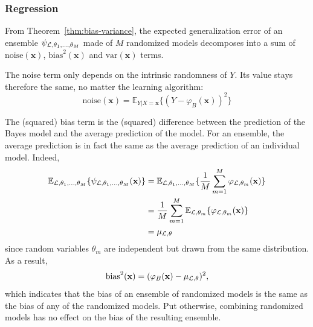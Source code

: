 \subsubsection{Regression}

From Theorem~\ref{thm:bias-variance}, the expected generalization error of an
ensemble $\psi_{{\cal L},\theta_1,\dots,\theta_M}$ made of $M$ randomized
models decomposes into a sum of $\text{noise}(\mathbf{x})$,
$\text{bias}^2(\mathbf{x})$ and $\text{var}(\mathbf{x})$ terms.

The noise term only depends on the intrinsic randomness of $Y$. Its value
stays therefore the same, no matter the learning algorithm:
\begin{equation}
\text{noise}(\mathbf{x}) = \mathbb{E}_{Y|X=\mathbf{x}} \{ (Y - \varphi_B(\mathbf{x}))^2 \}
\end{equation}

The (squared) bias term is the (squared) difference between the prediction of the Bayes model
and the average prediction of the model. For an ensemble, the average prediction
is in fact the same as the average prediction of an individual model. Indeed,
\begin{align}
\mathbb{E}_{{\cal L},\theta_1,\dots,\theta_M} \{ \psi_{{\cal L},\theta_1,\dots,\theta_M}(\mathbf{x}) \} &= \mathbb{E}_{{\cal L},\theta_1,\dots,\theta_M} \{ \frac{1}{M} \sum_{m=1}^M \varphi_{{\cal L},\theta_m}(\mathbf{x}) \} \nonumber \\
&= \frac{1}{M} \sum_{m=1}^M \mathbb{E}_{{\cal L},\theta_m} \{ \varphi_{{\cal L},\theta_m}(\mathbf{x}) \} \nonumber \\
&= \mu_{{\cal L},\theta}
\end{align}
since random variables $\theta_m$ are independent but drawn from the
same distribution. As a result,
\begin{equation}
\text{bias}^2(\mathbf{x}) = (\varphi_B(\mathbf{x}) - \mu_{{\cal L},\theta})^2,
\end{equation}
which indicates that the bias of an ensemble of randomized models is the same
as the bias of any of the randomized models. Put otherwise, combining
randomized models has no effect on the bias of the resulting ensemble.

